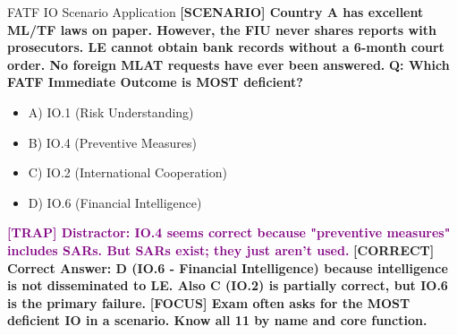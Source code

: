 \documentclass[11pt,a4paper]{beamer}
\newcommand{\examfocus}[1]{\textcolor{orange!80!black}{\textbf{[FOCUS] #1}}}
\newcommand{\trap}[1]{\textcolor{purple}{\textbf{[TRAP] #1}}}
\newcommand{\correct}[1]{\textcolor{green!50!black}{\textbf{[CORRECT] #1}}}
\newcommand{\scenario}[1]{\textcolor{blue!70!black}{\textbf{[SCENARIO] #1}}}
\begin{document}
\begin{frame}{FATF IO Scenario Application}
\scenario{Country A has excellent ML/TF laws on paper. However, the FIU never shares reports with prosecutors. LE cannot obtain bank records without a 6-month court order. No foreign MLAT requests have ever been answered.}
\vspace{0.2cm}
\textbf{Q: Which FATF Immediate Outcome is MOST deficient?}
\begin{itemize}
\item A) IO.1 (Risk Understanding)
\item B) IO.4 (Preventive Measures)
\item C) IO.2 (International Cooperation)
\item D) IO.6 (Financial Intelligence)
\end{itemize}
\trap{Distractor: IO.4 seems correct because "preventive measures" includes SARs. But SARs exist; they just aren't used.}
\correct{Correct Answer: D (IO.6 - Financial Intelligence) because intelligence is not disseminated to LE. Also C (IO.2) is partially correct, but IO.6 is the primary failure.}
\examfocus{Exam often asks for the MOST deficient IO in a scenario. Know all 11 by name and core function.}
\end{frame}

\end{document}

